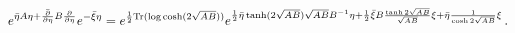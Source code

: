 \begin{equation*}
e^{\bar{\eta}A\eta +\bar{\frac{\partial }{\partial \eta }}B{\frac{\partial }{%
\partial \eta }}}e^{-\bar{\xi}\eta }=e^{{\frac{1}{2}}\mathrm{Tr}(\log \cosh
(2\sqrt{AB}))}e^{{\frac{1}{2}}\bar{\eta}\tanh (2\sqrt{AB})\sqrt{AB}%
B^{-1}\eta +{\frac{1}{2}}\bar{\xi}B{\frac{\tanh {2\sqrt{AB}}}{\sqrt{AB}}}\xi
+\bar{\eta}{\frac{1}{\cosh {2\sqrt{AB}}}}\xi }\,.
\end{equation*}

